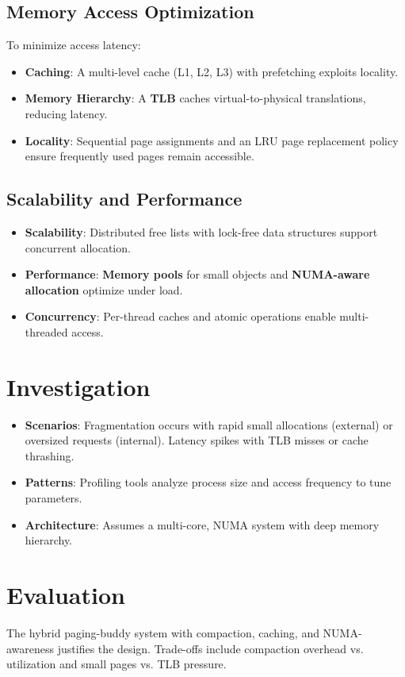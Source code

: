 \documentclass[a4paper,12pt]{article}
\begin{document}
\subsection{Memory Access Optimization}
To minimize access latency:
\begin{itemize}
    \item \textbf{Caching}: A multi-level cache (L1, L2, L3) with prefetching exploits locality.
    \item \textbf{Memory Hierarchy}: A \textbf{TLB} caches virtual-to-physical translations, reducing latency.
    \item \textbf{Locality}: Sequential page assignments and an LRU page replacement policy ensure frequently used pages remain accessible.
\end{itemize}

\subsection{Scalability and Performance}
\begin{itemize}
    \item \textbf{Scalability}: Distributed free lists with lock-free data structures support concurrent allocation.
    \item \textbf{Performance}: \textbf{Memory pools} for small objects and \textbf{NUMA-aware allocation} optimize under load.
    \item \textbf{Concurrency}: Per-thread caches and atomic operations enable multi-threaded access.
\end{itemize}

\section{Investigation}
\begin{itemize}
    \item \textbf{Scenarios}: Fragmentation occurs with rapid small allocations (external) or oversized requests (internal). Latency spikes with TLB misses or cache thrashing.
    \item \textbf{Patterns}: Profiling tools analyze process size and access frequency to tune parameters.
    \item \textbf{Architecture}: Assumes a multi-core, NUMA system with deep memory hierarchy.
\end{itemize}

\section{Evaluation}
The hybrid paging-buddy system with compaction, caching, and NUMA-awareness justifies the design. Trade-offs include compaction overhead vs. utilization and small pages vs. TLB pressure.
\end{document}
